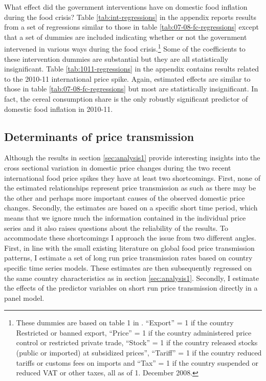 \documentclass[12pt,english]{article}
\begin{document}
What effect did the government interventions have on domestic food inflation during the food crisis? Table \ref{tab:int-regressions} in the appendix reports results from a set of regressions similar to those in table \ref{tab:07-08-fc-regressions} except that a set of dummies are included indicating whether or not the government intervened in various ways during the food crisis.\footnote{These dummies are based on table 1 in \citet{Demeke2009}. ``Export'' = 1 if the country Restricted or banned export, ``Price'' = 1 if the country administered price control or restricted private trade, ``Stock'' = 1 if the country released stocks (public or imported) at subsidized prices'', ``Tariff'' = 1 if the country reduced tariffs or customs fees on imports and ``Tax'' = 1 if the country suspended or reduced VAT or other taxes, all as of 1. December 2008.\label{int_note}} Some of the coefficients to these intervention dummies are substantial but they are all statistically insignificant. Table \ref{tab:1011-regressions} in the appendix contains results related to the 2010-11 international price spike. Again, estimated effects are similar to those in  table \ref{tab:07-08-fc-regressions} but most are statistically insignificant. In fact,  the cereal consumption share is the only robustly significant predictor of domestic food inflation in 2010-11.

\subsection{Determinants of price transmission \label{sec:analysis2}}
Although the results in section \ref{sec:analysis1} provide interesting insights into the cross sectional variation in domestic price changes during the two recent international food price spikes they have at least two shortcomings. First, none of the estimated relationships represent price transmission as such as there may be the other and perhaps more important causes of the observed domestic price changes. Secondly, the estimates are based on a specific short time period, which means that we ignore much the information contained in the individual price series and it also raises questions about the reliability of the results. To accommodate these shortcomings I approach the issue from two different angles. First, in line with the small existing literature on global food price transmission patterns, I estimate a set of long run price transmission rates based on country specific time series models. These estimates are then subsequently regressed on the same country characteristics as in section \ref{sec:analysis1}. Secondly, I estimate the effects of the predictor variables on short run price transmission directly in a panel model.
\end{document}
